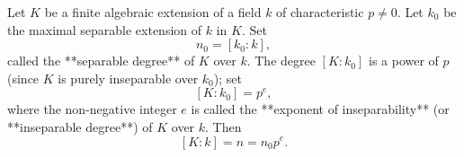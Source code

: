 Let $K$ be a finite algebraic extension of a field $k$ of characteristic $p \neq 0$. Let $k_0$ be the maximal separable extension of $k$ in $K$. Set
$$n_0 = [k_0 : k],$$
called the **separable degree** of $K$ over $k$. The degree $[K : k_0]$ is a power of $p$ (since $K$ is purely inseparable over $k_0$); set
$$[K : k_0] = p^e,$$
where the non-negative integer $e$ is called the **exponent of inseparability** (or **inseparable degree**) of $K$ over $k$. Then
$$[K : k] = n = n_0 p^e.$$
